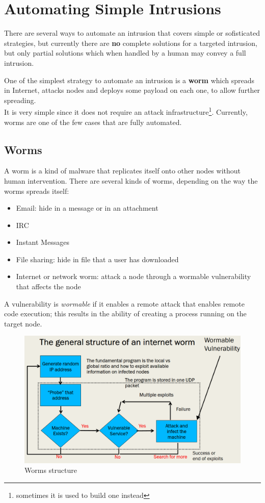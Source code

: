 \chapter{Automating Simple Intrusions}

There are several ways to automate an intrusion that covers
simple or sofisticated strategies,
but currently there are \textbf{no} complete solutions for a targeted intrusion, but only
partial solutions which when handled by a human may convey a full intrusion.\nl

One of the simplest strategy to automate an intrusion is a \textbf{worm} which spreads in Internet, attacks nodes
and deploys some payload on each one,
to allow further spreading.\\
It is very simple since it does not require an attack infrastructure\footnote{sometimes it is used to build one instead}.
Currently, worms are one of the few cases that are fully automated.

\section{Worms}
A worm is a kind of malware that replicates itself onto other nodes
without human intervention.
There are several kinds of worms, depending on the way the worms spreads itself:
\begin{itemize}
   \item Email: hide in a message or in an attachment
   \item IRC
   \item Instant Messages
   \item File sharing: hide in file that a user has downloaded
   \item Internet or network worm: attack a node through a wormable   vulnerability that affects the node
\end{itemize}
A vulnerability is \textit{wormable} if it enables a remote attack that enables remote code execution;
this results in the ability of creating a
process running on the target node.

\begin{figure}[htbp]
   \centering
   \includegraphics{images/worms_structure.png}
   \caption{Worms structure}
   \label{fig:worms_structure}
\end{figure}

